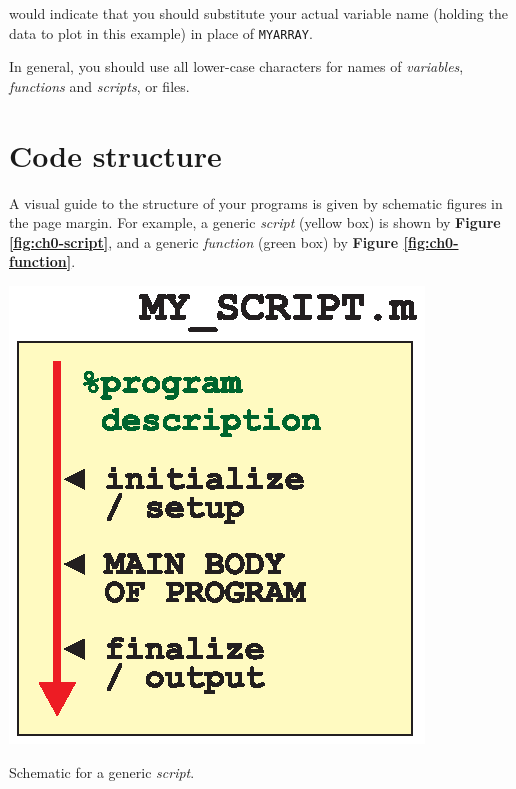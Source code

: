 \documentclass{tufte-book} %
\begin{document}
\noindent would indicate that you should substitute your actual variable name (holding the data to plot in this example) in place of \texttt{MYARRAY}.

In general, you should use all lower-case characters for names of \textit{variables}, \textit{functions} and \textit{scripts}, or files.
 

\section{Code structure}

A visual guide to the structure of your programs is given by schematic figures in the page margin. For example, a generic \textit{script} (yellow box) is shown by \textbf{Figure \ref{fig:ch0-script}}, and a generic \textit{function} (green box) by \textbf{Figure \ref{fig:ch0-function}}. 

\begin{marginfigure}[-0.0in]
\includegraphics[width=\linewidth]{ch0-script.eps}
\caption{Schematic for a generic \textit{script}.}
\label{fig:ch0-script}
\end{marginfigure}
\end{document}
